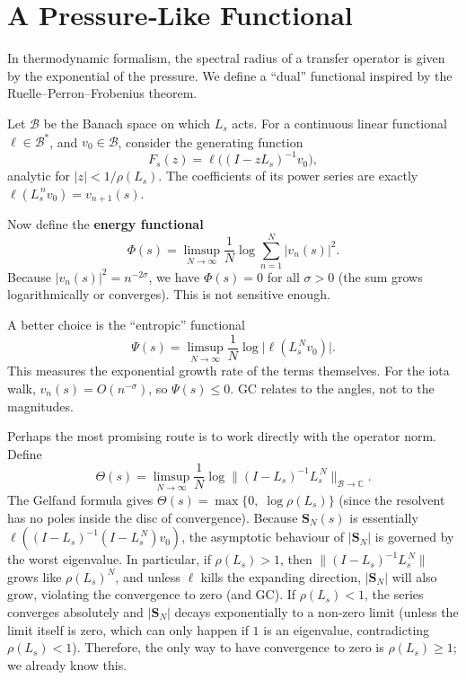 \documentclass[11pt,a4paper]{article}
\newcommand{\C}{\mathbb{C}}
\begin{document}
\section{A Pressure‑Like Functional}
In thermodynamic formalism, the spectral radius of a transfer operator is given by the exponential of the pressure.  We define a ``dual'' functional inspired by the Ruelle–Perron–Frobenius theorem.

Let $\mathcal{B}$ be the Banach space on which $L_s$ acts.  For a continuous linear functional $\ell \in \mathcal{B}^*$, and $v_0 \in \mathcal{B}$, consider the generating function
\[
F_s(z) = \ell\!\bigl( (I - z L_s)^{-1} v_0 \bigr),
\]
analytic for $|z| < 1/\rho(L_s)$.  The coefficients of its power series are exactly $ \ell(L_s^{\,n} v_0) = v_{n+1}(s)$.

Now define the \textbf{energy functional}
\[
\Phi(s) = \limsup_{N\to\infty} \frac{1}{N} \log \sum_{n=1}^{N} |v_n(s)|^2.
\]
Because $|v_n(s)|^2 = n^{-2\sigma}$, we have $\Phi(s) = 0$ for all $\sigma > 0$ (the sum grows logarithmically or converges).  This is not sensitive enough.

A better choice is the ``entropic'' functional
\[
\Psi(s) = \limsup_{N\to\infty} \frac{1}{N} \log \bigl| \ell( L_s^{\,N} v_0 ) \bigr|.
\]
This measures the exponential growth rate of the terms themselves.  For the iota walk, $v_n(s) = O(n^{-\sigma})$, so $\Psi(s) \le 0$.  GC relates to the angles, not to the magnitudes.

Perhaps the most promising route is to work directly with the operator norm.  Define
\[
\Theta(s) = \limsup_{N\to\infty} \frac{1}{N} \log \| (I - L_s)^{-1} L_s^{\,N} \|_{\mathcal{B} \to \C}.
\]
The Gelfand formula gives $\Theta(s) = \max\{ 0,\; \log \rho(L_s) \}$ (since the resolvent has no poles inside the disc of convergence).  Because $\mathbf{S}_N(s)$ is essentially $\ell( (I - L_s)^{-1} (I - L_s^{\,N}) v_0 )$, the asymptotic behaviour of $|\mathbf{S}_N|$ is governed by the worst eigenvalue.  In particular, if $\rho(L_s) > 1$, then $\| (I - L_s)^{-1} L_s^{\,N} \|$ grows like $\rho(L_s)^N$, and unless $\ell$ kills the expanding direction, $|\mathbf{S}_N|$ will also grow, violating the convergence to zero (and GC).  If $\rho(L_s) < 1$, the series converges absolutely and $|\mathbf{S}_N|$ decays exponentially to a non‑zero limit (unless the limit itself is zero, which can only happen if $1$ is an eigenvalue, contradicting $\rho(L_s) < 1$).  Therefore, the only way to have convergence to zero is $\rho(L_s) \ge 1$; we already know this.
\end{document}
